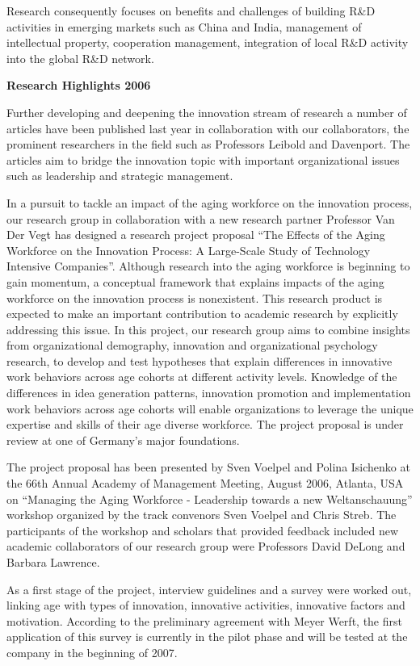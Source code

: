  Research consequently focuses on benefits and challenges of building R\&D activities in emerging markets such as China and India, management of intellectual property, cooperation management, integration of local R\&D activity into the global R\&D network.

\null
\textbf{Research Highlights 2006}

 Further developing and deepening the innovation stream of research a number of articles have been published last year in collaboration with our collaborators, the prominent researchers in the field such as Professors Leibold and Davenport. The articles aim to bridge the innovation topic with important organizational issues such as leadership and strategic management.

 In a pursuit to tackle an impact of the aging workforce on the innovation process, our research group in collaboration with a new research partner Professor Van Der Vegt has designed a research project proposal ``The Effects of the Aging Workforce on the Innovation Process: A Large-Scale Study of Technology Intensive Companies''. Although research into the aging workforce is beginning to gain momentum, a conceptual framework that explains impacts of the aging workforce on the innovation process is nonexistent. This research product is expected to make an important contribution to academic research by explicitly addressing this issue. In this project, our research group aims to combine insights from organizational demography, innovation and organizational psychology research, to develop and test hypotheses that explain differences in innovative work behaviors across age cohorts at different activity levels. Knowledge of the differences in idea generation patterns, innovation promotion and implementation work behaviors across age cohorts will enable organizations to leverage the unique expertise and skills of their age diverse workforce. The project proposal is under review at one of Germany's major foundations. 

 The project proposal has been presented by Sven Voelpel and Polina Isichenko at the 66th Annual Academy of Management Meeting, August 2006, Atlanta, USA on ``Managing the Aging Workforce - Leadership towards a new Weltanschauung'' workshop organized by the track convenors Sven Voelpel and Chris Streb. The participants of the workshop and scholars that provided feedback included new academic collaborators of our research group were Professors David DeLong and Barbara Lawrence. 

 As a first stage of the project, interview guidelines and a survey were worked out, linking age with types of innovation, innovative activities, innovative factors and motivation. According to the preliminary agreement with Meyer Werft, the first application of this survey is currently in the pilot phase and will be tested at the company in the beginning of 2007.


